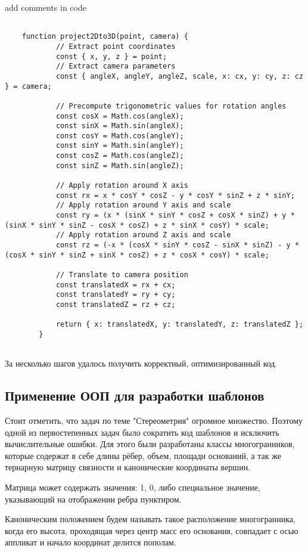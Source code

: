 \begin{leftBox}
	add comments in code
\end{leftBox}

\begin{lstlisting}
	
	function project2Dto3D(point, camera) {
			// Extract point coordinates
			const { x, y, z } = point;
			// Extract camera parameters
			const { angleX, angleY, angleZ, scale, x: cx, y: cy, z: cz } = camera;

			// Precompute trigonometric values for rotation angles
			const cosX = Math.cos(angleX);
			const sinX = Math.sin(angleX);
			const cosY = Math.cos(angleY);
			const sinY = Math.sin(angleY);
			const cosZ = Math.cos(angleZ);
			const sinZ = Math.sin(angleZ);

			// Apply rotation around X axis
			const rx = x * cosY * cosZ - y * cosY * sinZ + z * sinY;
			// Apply rotation around Y axis and scale
			const ry = (x * (sinX * sinY * cosZ + cosX * sinZ) + y * (sinX * sinY * sinZ - cosX * cosZ) + z * sinX * cosY) * scale;
			// Apply rotation around Z axis and scale
			const rz = (-x * (cosX * sinY * cosZ - sinX * sinZ) - y * (cosX * sinY * sinZ + sinX * cosZ) + z * cosX * cosY) * scale;

			// Translate to camera position
			const translatedX = rx + cx;
			const translatedY = ry + cy;
			const translatedZ = rz + cz;

			return { x: translatedX, y: translatedY, z: translatedZ };
		}
	
\end{lstlisting}

За несколько шагов удалось получить корректный, оптимизированный код.

\subsection{Применение ООП для разработки шаблонов}

Стоит отметить, что задач по теме "Стереометрия" огромное множество. Поэтому одной из первостепенных задач было сократить код шаблонов и исключить вычислительные ошибки. Для этого были разработаны классы многогранников, которые содержат в себе длины рёбер, объем, площади оснований, а так же тернарную матрицу связности и канонические координаты вершин.

Матрица может содержать значения: 1, 0, либо специальное значение, указывающий на отображении ребра пунктиром.

Каноническим положением будем называть такое расположение многогранника, когда его высота, проходящая через центр масс его основания, совпадает с осью аппликат и начало координат делится пополам.

